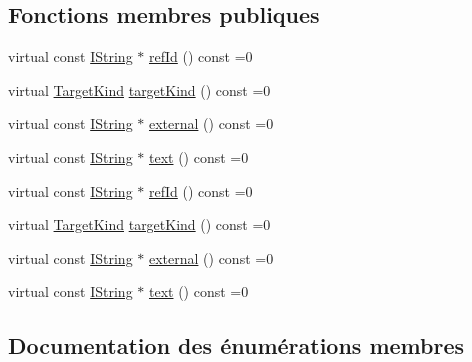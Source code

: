 \subsection*{Fonctions membres publiques}
\begin{DoxyCompactItemize}
\item 
virtual const \hyperlink{class_i_string}{I\+String} $\ast$ \hyperlink{class_i_doc_ref_ad4ef5530ff0093bedc3ae63583e90a10}{ref\+Id} () const  =0
\item 
virtual \hyperlink{class_i_doc_ref_af94834302f9f23860d170dc0a8529c08}{Target\+Kind} \hyperlink{class_i_doc_ref_a4711ff896074547cee561614dfa381d9}{target\+Kind} () const  =0
\item 
virtual const \hyperlink{class_i_string}{I\+String} $\ast$ \hyperlink{class_i_doc_ref_a4cebac406fa336b9a67c103a34346542}{external} () const  =0
\item 
virtual const \hyperlink{class_i_string}{I\+String} $\ast$ \hyperlink{class_i_doc_ref_af914f542dbbe4762e0fb73f704e1fec6}{text} () const  =0
\item 
virtual const \hyperlink{class_i_string}{I\+String} $\ast$ \hyperlink{class_i_doc_ref_ad4ef5530ff0093bedc3ae63583e90a10}{ref\+Id} () const  =0
\item 
virtual \hyperlink{class_i_doc_ref_af94834302f9f23860d170dc0a8529c08}{Target\+Kind} \hyperlink{class_i_doc_ref_a4711ff896074547cee561614dfa381d9}{target\+Kind} () const  =0
\item 
virtual const \hyperlink{class_i_string}{I\+String} $\ast$ \hyperlink{class_i_doc_ref_a4cebac406fa336b9a67c103a34346542}{external} () const  =0
\item 
virtual const \hyperlink{class_i_string}{I\+String} $\ast$ \hyperlink{class_i_doc_ref_af914f542dbbe4762e0fb73f704e1fec6}{text} () const  =0
\end{DoxyCompactItemize}


\subsection{Documentation des énumérations membres}
\hypertarget{class_i_doc_ref_af94834302f9f23860d170dc0a8529c08}{}
